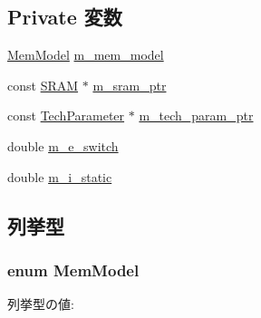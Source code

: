 \subsection*{Private 変数}
\begin{DoxyCompactItemize}
\item 
\hyperlink{classMemUnit_a91d4011a8e9d06c93676d9d208a70b62}{MemModel} \hyperlink{classMemUnit_ab0ab3d5054315ae2b4774def19e49725}{m\_\-mem\_\-model}
\item 
const \hyperlink{classSRAM}{SRAM} $\ast$ \hyperlink{classMemUnit_aab5dce4213ab482c5e1909bfc96d62af}{m\_\-sram\_\-ptr}
\item 
const \hyperlink{classTechParameter}{TechParameter} $\ast$ \hyperlink{classMemUnit_a11d1644aa2bfe0e16783dface6fadf13}{m\_\-tech\_\-param\_\-ptr}
\item 
double \hyperlink{classMemUnit_a7ce8ef1ca298dcacf23bf88066e5eb5d}{m\_\-e\_\-switch}
\item 
double \hyperlink{classMemUnit_a16f0c9e5942378eab4d83da3c61aba7f}{m\_\-i\_\-static}
\end{DoxyCompactItemize}


\subsection{列挙型}
\hypertarget{classMemUnit_a91d4011a8e9d06c93676d9d208a70b62}{
\subsubsection[{MemModel}]{\setlength{\rightskip}{0pt plus 5cm}enum {\bf MemModel}}}
\label{classMemUnit_a91d4011a8e9d06c93676d9d208a70b62}
\begin{Desc}
\item[列挙型の値: ]\par
\begin{description}
\item[{\em 
\hypertarget{classMemUnit_a91d4011a8e9d06c93676d9d208a70b62abab57b6e2c553e4d983f415a1f4ea75b}{
NO\_\-MODEL}
\label{classMemUnit_a91d4011a8e9d06c93676d9d208a70b62abab57b6e2c553e4d983f415a1f4ea75b}
}]\item[{\em 
\hypertarget{classMemUnit_a91d4011a8e9d06c93676d9d208a70b62ad3379d0af95e2e9dcbcfdb016d1cf9b3}{
NORMAL\_\-MEM}
\label{classMemUnit_a91d4011a8e9d06c93676d9d208a70b62ad3379d0af95e2e9dcbcfdb016d1cf9b3}
}]\end{description}
\end{Desc}




